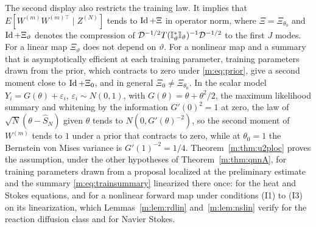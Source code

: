 \begin{remark}
The second display also restricts the training law. It implies that $E[W^{(m)}W^{(m)\top}\mid Z^{(N)}]$ tends to $\operatorname{Id}+\Xi$ in operator norm, where $\Xi=\Xi_{\theta_0}$ and $\operatorname{Id}+\Xi_\vartheta$ denotes the compression of $\mathcal D^{-1/2}T(\mathbb{I}^*_\vartheta\mathbb{I}_\vartheta)^{-1}\mathcal D^{-1/2}$ to the first $J$ modes. For a linear map $\Xi_\vartheta$ does not depend on $\vartheta$. For a nonlinear map and a summary that is asymptotically efficient at each training parameter, training parameters drawn from the prior, which contracts to zero under \eqref{m:eq:prior}, give a second moment close to $\operatorname{Id}+\Xi_0$, and in general $\Xi_0\ne\Xi_{\theta_0}$. In the scalar model $Y_i=G(\theta)+\varepsilon_i$, $\varepsilon_i\sim N(0,1)$, with $G(\theta)=\theta+\theta^2/2$, the maximum likelihood summary and whitening by the information $G'(0)^2=1$ at zero, the law of $\sqrt N(\theta-\hat S_N)$ given $\theta$ tends to $N(0,G'(\theta)^{-2})$, so the second moment of $W^{(m)}$ tends to $1$ under a prior that contracts to zero, while at $\theta_0=1$ the Bernstein von Mises variance is $G'(1)^{-2}=1/4$. Theorem~\ref{m:thm:u2ploc} proves the assumption, under the other hypotheses of Theorem~\ref{m:thm:qnnA}, for training parameters drawn from a proposal localized at the preliminary estimate and the summary \eqref{m:eq:trainsummary} linearized there once: for the heat and Stokes equations, and for a nonlinear forward map under conditions (I1) to (I3) on its linearization, which Lemmas~\ref{m:lem:rdlin} and~\ref{m:lem:nslin} verify for the reaction diffusion class and for Navier Stokes.
\end{remark}

